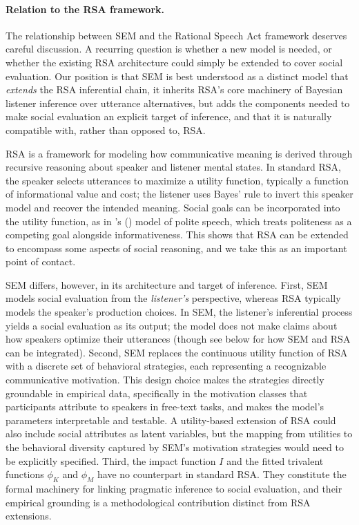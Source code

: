 \documentclass[12pt,a4paper]{article}
\begin{document}
\paragraph{Relation to the RSA framework.}
The relationship between SEM and the Rational Speech Act framework
\citep{frank2012,goodman2016} deserves careful discussion. A recurring question
is whether a new model is needed, or whether the existing RSA architecture could
simply be extended to cover social evaluation. Our position is that SEM is best
understood as a distinct model that \emph{extends} the RSA inferential chain, it
inherits RSA's core machinery of Bayesian listener inference over utterance
alternatives, but adds the components needed to make social evaluation an explicit
target of inference, and that it is naturally compatible with, rather than
opposed to, RSA.

RSA is a framework for modeling how communicative meaning is derived through
recursive reasoning about speaker and listener mental states. In standard RSA,
the speaker selects utterances to maximize a utility function, typically a
function of informational value and cost; the listener uses Bayes' rule to invert
this speaker model and recover the intended meaning. Social goals can be
incorporated into the utility function, as in \citeauthor{yoontessleretal2020}'s
(\citeyear{yoontessleretal2020}) model of polite speech, which treats politeness
as a competing goal alongside informativeness. This shows that RSA can be
extended to encompass some aspects of social reasoning, and we take this as an
important point of contact.

SEM differs, however, in its architecture and target of inference. First, SEM
models social evaluation from the \emph{listener's} perspective, whereas RSA
typically models the speaker's production choices. In SEM, the listener's
inferential process yields a social evaluation as its output; the model does not
make claims about how speakers optimize their utterances (though see below for
how SEM and RSA can be integrated). Second, SEM replaces the continuous utility
function of RSA with a discrete set of behavioral strategies, each representing a
recognizable communicative motivation. This design choice makes the strategies
directly groundable in empirical data, specifically in the motivation classes
that participants attribute to speakers in free-text tasks, and makes the model's
parameters interpretable and testable. A utility-based extension of RSA could
also include social attributes as latent variables, but the mapping from
utilities to the behavioral diversity captured by SEM's motivation strategies
would need to be explicitly specified. Third, the impact function $I$ and the
fitted trivalent functions $\phi_K$ and $\phi_M$ have no counterpart in standard
RSA. They constitute the formal machinery for linking pragmatic inference to
social evaluation, and their empirical grounding is a methodological contribution
distinct from RSA extensions.
\end{document}
